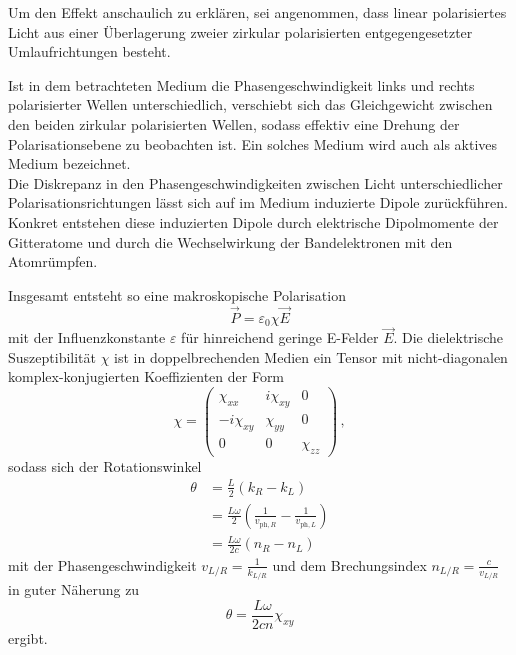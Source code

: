 Um den Effekt anschaulich zu erklären, sei angenommen, dass linear polarisiertes Licht aus einer Überlagerung zweier zirkular polarisierten
entgegengesetzter Umlaufrichtungen besteht.

Ist in dem betrachteten Medium die Phasengeschwindigkeit links und rechts polarisierter Wellen unterschiedlich, verschiebt sich das Gleichgewicht zwischen
den beiden zirkular polarisierten Wellen, sodass effektiv eine Drehung der Polarisationsebene zu beobachten ist.
Ein solches Medium wird auch als aktives Medium bezeichnet. \\

Die Diskrepanz in den Phasengeschwindigkeiten zwischen Licht unterschiedlicher Polarisationsrichtungen lässt sich auf im Medium induzierte Dipole zurückführen.
Konkret entstehen diese induzierten Dipole durch elektrische Dipolmomente der Gitteratome und durch die Wechselwirkung der Bandelektronen mit den Atomrümpfen.

Insgesamt entsteht so eine makroskopische Polarisation
\begin{equation}
    \vec{P} = \varepsilon_0 \chi \vec{E}
    \label{eq:polarisation} 
\end{equation}
mit der Influenzkonstante $\varepsilon$ für hinreichend geringe E-Felder $\vec{E}$.
Die dielektrische Suszeptibilität $\chi$ ist in doppelbrechenden Medien ein Tensor mit nicht-diagonalen komplex-konjugierten Koeffizienten der Form
\begin{equation*}
    \chi = \left( \begin{matrix}
        \chi_{xx}     & i\chi_{xy}    & 0 \\
        - i \chi_{xy} & \chi_{yy}     & 0 \\
        0             & 0             & \chi_{zz}
    \end{matrix}\right) \,,
\end{equation*}
sodass sich der Rotationswinkel 
\begin{align*}
    \theta &= \frac{L}{2} (k_R - k_L) \\
           &= \frac{L \omega}{2} \left(\frac{1}{v_{\text{ph},R}} - \frac{1}{v_{\text{ph},L}}\right) \\
           &= \frac{L \omega}{2 c} (n_R - n_L)
\end{align*}
mit der Phasengeschwindigkeit $v_{L/R} = \frac{1}{k_{L/R}}$ und dem Brechungsindex $n_{L/R} = \frac{c}{v_{L/R}}$ in guter Näherung zu
\begin{equation}
    \theta = \frac{L \omega}{2 c n} \chi_{xy}
    \label{eq:thetanoB}
\end{equation}
ergibt.

